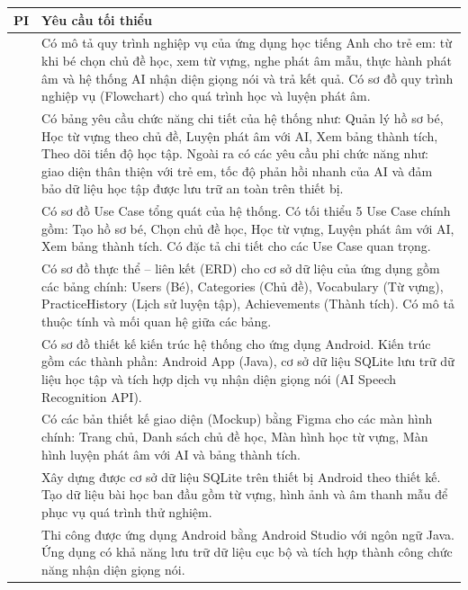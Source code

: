 \documentclass[../main.tex]{subfiles}
\begin{document}
	\begin{center}
		\small
		\renewcommand{\arraystretch}{1.25}
		\setlength{\tabcolsep}{5pt}
		\begin{longtable}{|>{\centering\arraybackslash}p{1.2cm}|
				>{\raggedright\arraybackslash}p{13.2cm}|}
			\hline
			\textbf{PI} & \centering\textbf{Yêu cầu tối thiểu}\tabularnewline
			\hline
			1.1 & Có mô tả quy trình nghiệp vụ của ứng dụng học tiếng Anh cho trẻ em: từ khi bé chọn chủ đề học, xem từ vựng, nghe phát âm mẫu, thực hành phát âm và hệ thống AI nhận diện giọng nói và trả kết quả. Có sơ đồ quy trình nghiệp vụ (Flowchart) cho quá trình học và luyện phát âm.\\ \hline
			1.2 & Có bảng yêu cầu chức năng chi tiết của hệ thống như: Quản lý hồ sơ bé, Học từ vựng theo chủ đề, Luyện phát âm với AI, Xem bảng thành tích, Theo dõi tiến độ học tập. Ngoài ra có các yêu cầu phi chức năng như: giao diện thân thiện với trẻ em, tốc độ phản hồi nhanh của AI và đảm bảo dữ liệu học tập được lưu trữ an toàn trên thiết bị.\\ \hline
			1.3 & Có sơ đồ Use Case tổng quát của hệ thống. Có tối thiểu 5 Use Case chính gồm: Tạo hồ sơ bé, Chọn chủ đề học, Học từ vựng, Luyện phát âm với AI, Xem bảng thành tích. Có đặc tả chi tiết cho các Use Case quan trọng.\\ \hline
			2.1 & Có sơ đồ thực thể -- liên kết (ERD) cho cơ sở dữ liệu của ứng dụng gồm các bảng chính: Users (Bé), Categories (Chủ đề), Vocabulary (Từ vựng), PracticeHistory (Lịch sử luyện tập), Achievements (Thành tích). Có mô tả thuộc tính và mối quan hệ giữa các bảng.\\ \hline
			2.2 & Có sơ đồ thiết kế kiến trúc hệ thống cho ứng dụng Android. Kiến trúc gồm các thành phần: Android App (Java), cơ sở dữ liệu SQLite lưu trữ dữ liệu học tập và tích hợp dịch vụ nhận diện giọng nói (AI Speech Recognition API).\\ \hline
			2.3 & Có các bản thiết kế giao diện (Mockup) bằng Figma cho các màn hình chính: Trang chủ, Danh sách chủ đề học, Màn hình học từ vựng, Màn hình luyện phát âm với AI và bảng thành tích.\\ \hline
			3.1 & Xây dựng được cơ sở dữ liệu SQLite trên thiết bị Android theo thiết kế. Tạo dữ liệu bài học ban đầu gồm từ vựng, hình ảnh và âm thanh mẫu để phục vụ quá trình thử nghiệm.\\ \hline
			3.2 & Thi công được ứng dụng Android bằng Android Studio với ngôn ngữ Java. Ứng dụng có khả năng lưu trữ dữ liệu cục bộ và tích hợp thành công chức năng nhận diện giọng nói.\\ \hline

\end{longtable}
\end{center}
\end{document}
